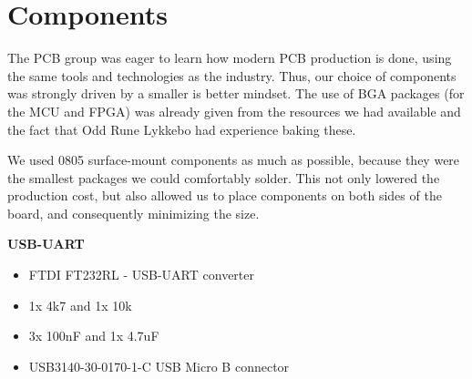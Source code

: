 \section{Components}

The PCB group was eager to learn how modern PCB production is done, using the
same tools and technologies as the industry. Thus, our choice of components was
strongly driven by a smaller is better mindset. The use of BGA packages (for
the MCU and FPGA) was already given from the resources we had available and the
fact that Odd Rune Lykkebo had experience baking these.

We used 0805 surface-mount components as much as possible, because they were the
smallest packages we could comfortably solder. This not only lowered the
production cost, but also allowed us to place components on both sides of the
board, and consequently minimizing the size.

{\bf USB-UART}
\begin{itemize}
  \item FTDI FT232RL - USB-UART converter
  \item 1x 4k7 and 1x 10k
  \item 3x 100nF and 1x 4.7uF
  \item USB3140-30-0170-1-C USB Micro B connector 
\end{itemize}


  



	
